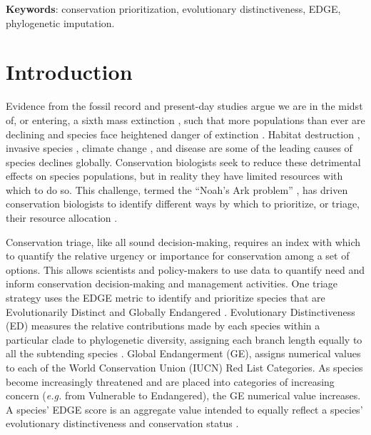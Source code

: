 \documentclass[10pt,english]{article}
\begin{document}
\textbf{Keywords}: conservation prioritization, evolutionary distinctiveness, 
EDGE, phylogenetic imputation.

\clearpage
\section*{Introduction}

Evidence from the fossil record and present-day studies argue we are in the
midst of, or entering, a sixth mass extinction \autocite{Barnosky2011,
Ceballos2015}, such that more populations than ever are declining and species
face heightened danger of extinction \autocite{Wake2008, Thomas2004}. Habitat
destruction \autocite{Brooks2002}, invasive species \autocite{Molnar2008},
climate change \autocite{Pounds2006}, and disease \autocite{Lips2006} are some
of the leading causes of species declines globally. Conservation biologists seek
to reduce these detrimental effects on species populations, but in reality they
have limited resources with which to do so. This challenge, termed the “Noah's
Ark problem” \autocite{Weitzman1998}, has driven conservation biologists to
identify different ways by which to prioritize, or triage, their resource
allocation \autocite{Bottrill2008}.

Conservation triage, like all sound decision-making, requires an index  with
which to quantify the relative urgency or importance for conservation among a
set of options. This allows scientists and policy-makers to use data to quantify
need and inform conservation decision-making and management activities. One
triage strategy uses the EDGE metric to identify and prioritize species that are
Evolutionarily Distinct and Globally Endangered \autocite{Isaac2007}.
Evolutionary Distinctiveness (ED) measures the relative contributions made by
each species within a particular clade to phylogenetic diversity, assigning each
branch length equally to all the subtending species \autocite{Redding2003,
Isaac2007}. Global Endangerment (GE), assigns numerical values to each of the
World Conservation Union (IUCN) Red List Categories. As species become
increasingly threatened and are placed into categories of increasing concern
(\emph{e.g.} from Vulnerable to Endangered), the GE numerical value increases. A
species’ EDGE score is an aggregate value intended to equally reflect a
species’ evolutionary distinctiveness and conservation status \autocite[even if
it does not always in practice; see][]{Pearse2015}.
\end{document}
